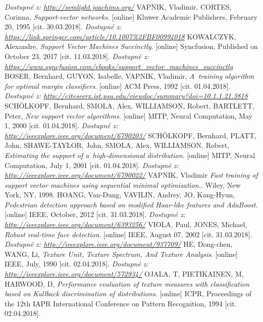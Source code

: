 \begin{thebibliography}{99}
 		\textit{Dostupné z: \url{http://svmlight.joachims.org/}}
	 VAPNIK, Vladimir, CORTES, Corinna, \textit{Support-vector networks}. [online] Kluwer Academic Publishers, February 20, 1995 [cit. 30.03.2018]. 
 		\textit{Dostupné z: \url{https://link.springer.com/article/10.1007\%2FBF00994018}}
	 KOWALCZYK, Alexandre.  \textit{Support Vector Machines Succinctly}.  [online] Syncfusion, Published on October 23, 2017 [cit. 11.03.2018]. 
		\textit{Dostupné z: \url{https://www.syncfusion.com/ebooks/support_vector_machines_succinctly}}
	 BOSER, Bernhard, GUYON, Isabelle, VAPNIK, Vladimir, \textit{A~training algorithm for optimal margin classifiers}. [online] ACM Press, 1992 [cit. 01.04.2018]. 
 		\textit{Dostupné z: \url{http://citeseerx.ist.psu.edu/viewdoc/summary?doi=10.1.1.21.3818}}
 	 SCHÖLKOPF, Bernhard, SMOLA, Alex, WILLIAMSON, Robert, BARTLETT, Peter, \textit{New support vector algorithms}. [online] MITP, Neural Computation, May 1, 2000 [cit. 01.04.2018]. 
 		\textit{Dostupné z: \url{http://ieeexplore.ieee.org/document/6790203/}}
 	 SCHÖLKOPF, Bernhard, PLATT, John, SHAWE-TAYLOR, John, SMOLA, Alex, WILLIAMSON, Robert, \textit{Estimating the support of a~high-dimensional distribution}. [online] MITP, Neural Computation, July 1, 2001 [cit. 01.04.2018]. 
 		\textit{Dostupné z: \url{http://ieeexplore.ieee.org/document/6790022/}}
 	 VAPNIK, Vladimir \textit{Fast training of support vector machines using sequential minimal optimization.}. Wiley, New York, NY, 1998. 
 	 HOANG, Van-Dung, VAVILIN, Andrey, JO, Kang-Hyun, \textit{Pedestrian detection approach based on modified Haar-like features and AdaBoost}. [online] IEEE, October, 2012 [cit. 31.03.2018]. 
 		\textit{Dostupné z: \url{http://ieeexplore.ieee.org/document/6393256/}}
 	 VIOLA, Paul, JONES, Michael, \textit{Robust real-time face detection}. [online] IEEE, August 07, 2002 [cit. 31.03.2018]. 
 		\textit{Dostupné z: \url{http://ieeexplore.ieee.org/document/937709/}}
 	 HE, Dong-chen, WANG, Li, \textit{Texture Unit, Texture Spectrum, And Texture Analysis}. [online] IEEE, July, 1990 [cit. 02.04.2018]. 
 		\textit{Dostupné z: \url{http://ieeexplore.ieee.org/document/572934/}}
 	 OJALA, T, PIETIKAINEN, M, HARWOOD, D, \textit{Performance evaluation of texture measures with classification based on Kullback discrimination of distributions}. [online] ICPR, Proceedings of the 12th IAPR International Conference on Pattern Recognition, 1994 [cit. 02.04.2018]. 

\end{thebibliography}
